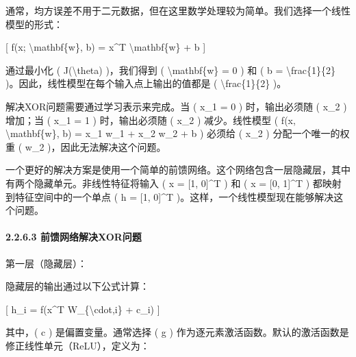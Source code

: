通常，均方误差不用于二元数据，但在这里数学处理较为简单。我们选择一个线性模型的形式：

{[} f(x; \textbackslash mathbf\{w\}, b) = x\^{}T
\textbackslash mathbf\{w\} + b {]}


通过最小化 ( J(\textbackslash theta) )，我们得到 (
\textbackslash mathbf\{w\} = 0 ) 和 ( b = \textbackslash frac\{1\}\{2\}
)。因此，线性模型在每个输入点上输出的值都是 (
\textbackslash frac\{1\}\{2\} )。

解决XOR问题需要通过学习表示来完成。当 ( x\_1 = 0 ) 时，输出必须随 ( x\_2
) 增加；当 ( x\_1 = 1 ) 时，输出必须随 ( x\_2 ) 减少。线性模型 ( f(x,
\textbackslash mathbf\{w\}, b) = x\_1 w\_1 + x\_2 w\_2 + b ) 必须给 (
x\_2 ) 分配一个唯一的权重 ( w\_2 )，因此无法解决这个问题。


一个更好的解决方案是使用一个简单的前馈网络。这个网络包含一层隐藏层，其中有两个隐藏单元。非线性特征将输入
( x = {[}1, 0{]}\^{}T ) 和 ( x = {[}0, 1{]}\^{}T )
都映射到特征空间中的一个单点 ( h = {[}1, 0{]}\^{}T
)。这样，一个线性模型现在能够解决这个问题。

\paragraph{\texorpdfstring{\textbf{2.2.6.3
前馈网络解决XOR问题}}{2.2.6.3 前馈网络解决XOR问题}}\label{2263-ux524dux9988ux7f51ux7edcux89e3ux51b3xorux95eeux9898}


第一层（隐藏层）：

隐藏层的输出通过以下公式计算：

{[} h\_i = f(x\^{}T W\_\{\textbackslash cdot,i\} + c\_i) {]}


其中，( c ) 是偏置变量。通常选择 ( g )
作为逐元素激活函数。默认的激活函数是修正线性单元（ReLU），定义为：

